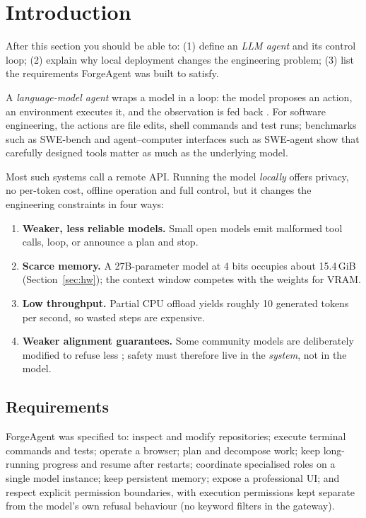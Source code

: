 \documentclass[11pt,a4paper]{article}
\begin{document}
\tableofcontents
\clearpage

\section{Introduction}
\begin{objectives}
After this section you should be able to: (1) define an \emph{LLM agent} and its control loop; (2) explain why local deployment changes the engineering
problem; (3) list the requirements ForgeAgent was built to satisfy.
\end{objectives}

A \emph{language-model agent} wraps a model in a loop: the model proposes an action, an environment executes it, and the observation is fed
back \citep{yao2023react,wang2024survey}. For software engineering, the actions are file edits, shell commands and test runs; benchmarks such as
SWE-bench \citep{jimenez2024swebench} and agent--computer interfaces such as SWE-agent \citep{yang2024sweagent} show that carefully designed tools matter as much as the
underlying model.

Most such systems call a remote API. Running the model \emph{locally} offers privacy, no per-token cost, offline operation and full control, but it changes
the engineering constraints in four ways:
\begin{enumerate}[nosep]
  \item \textbf{Weaker, less reliable models.} Small open models emit malformed tool calls, loop, or announce a plan and stop.
  \item \textbf{Scarce memory.} A 27B-parameter model at 4 bits occupies about 15.4\,GiB (Section~\ref{sec:hw}); the context window competes with the weights for VRAM.
  \item \textbf{Low throughput.} Partial CPU offload yields roughly 10 generated tokens per second, so wasted steps are expensive.
  \item \textbf{Weaker alignment guarantees.} Some community models are deliberately modified to refuse less \citep{arditi2024refusal}; safety must therefore live in the \emph{system}, not in the model.
\end{enumerate}

\subsection{Requirements}
ForgeAgent was specified to: inspect and modify repositories; execute terminal commands and tests; operate a browser; plan and decompose work; keep long-running
progress and resume after restarts; coordinate specialised roles on a single model instance; keep persistent memory; expose a professional UI; and respect explicit
permission boundaries, with execution permissions kept separate from the model's own refusal behaviour (no keyword filters in the gateway).
\end{document}
